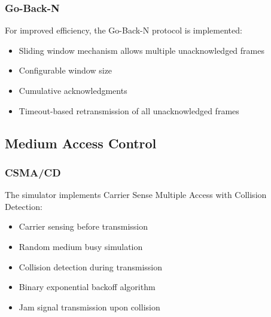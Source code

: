 \documentclass[12pt,a4paper]{article}
\begin{document}
\subsubsection{Go-Back-N}
For improved efficiency, the Go-Back-N protocol is implemented:
\begin{itemize}
    \item Sliding window mechanism allows multiple unacknowledged frames
    \item Configurable window size
    \item Cumulative acknowledgments
    \item Timeout-based retransmission of all unacknowledged frames
\end{itemize}

\subsection{Medium Access Control}
\subsubsection{CSMA/CD}
The simulator implements Carrier Sense Multiple Access with Collision Detection:
\begin{itemize}
    \item Carrier sensing before transmission
    \item Random medium busy simulation
    \item Collision detection during transmission
    \item Binary exponential backoff algorithm
    \item Jam signal transmission upon collision
\end{itemize}
\end{document}
